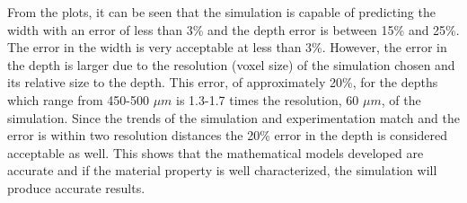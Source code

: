 From the plots, it can be seen that the simulation is capable of predicting the width with an error of less than 3\% and the depth error is between 15\% and 25\%.  The error in the width is very acceptable at less than 3\%.
However, the error in the depth is larger due to the resolution (voxel size) of the simulation chosen and its relative size to the depth.  This error, of approximately 20\%, for the depths which range from 450-500 $\mu m$ is 1.3-1.7 times the resolution, 60 $\mu m$, of the simulation.  Since the trends of the simulation and experimentation match and the error is within two resolution distances the 20\% error in the depth is considered acceptable as well. 
This shows that the mathematical models developed are accurate and if the material property is well characterized, the simulation will produce accurate results.

